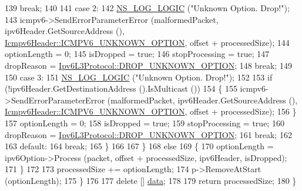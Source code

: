 \begin{DoxyCode}
139               \textcolor{keywordflow}{break};
140 
141             \textcolor{keywordflow}{case} 2:
142               \hyperlink{group__logging_ga88acd260151caf2db9c0fc84997f45ce}{NS\_LOG\_LOGIC} (\textcolor{stringliteral}{"Unknown Option. Drop!"});
143               icmpv6->SendErrorParameterError (malformedPacket, ipv6Header.GetSourceAddress (), 
      \hyperlink{classns3_1_1Icmpv6Header_ae9230cd167393f553a3c2ded106858caa4712d4dbbcd93e660a8ae14f50726629}{Icmpv6Header::ICMPV6\_UNKNOWN\_OPTION}, offset + processedSize);
144               optionLength = 0;
145               isDropped = \textcolor{keyword}{true};
146               stopProcessing = \textcolor{keyword}{true};
147               dropReason = \hyperlink{classns3_1_1Ipv6L3Protocol_a33c64db9bc35f71ff368b132bfffa37aa803fe59e441ce2bc53f0fe19df60c14a}{Ipv6L3Protocol::DROP\_UNKNOWN\_OPTION};
148               \textcolor{keywordflow}{break};
149 
150             \textcolor{keywordflow}{case} 3:
151               \hyperlink{group__logging_ga88acd260151caf2db9c0fc84997f45ce}{NS\_LOG\_LOGIC} (\textcolor{stringliteral}{"Unknown Option. Drop!"});
152 
153               \textcolor{keywordflow}{if} (!ipv6Header.GetDestinationAddress ().IsMulticast ())
154                 \{
155                   icmpv6->SendErrorParameterError (malformedPacket, ipv6Header.GetSourceAddress (), 
      \hyperlink{classns3_1_1Icmpv6Header_ae9230cd167393f553a3c2ded106858caa4712d4dbbcd93e660a8ae14f50726629}{Icmpv6Header::ICMPV6\_UNKNOWN\_OPTION}, offset + processedSize);
156                 \}
157               optionLength = 0;
158               isDropped = \textcolor{keyword}{true};
159               stopProcessing = \textcolor{keyword}{true};
160               dropReason = \hyperlink{classns3_1_1Ipv6L3Protocol_a33c64db9bc35f71ff368b132bfffa37aa803fe59e441ce2bc53f0fe19df60c14a}{Ipv6L3Protocol::DROP\_UNKNOWN\_OPTION};
161               \textcolor{keywordflow}{break};
162 
163             \textcolor{keywordflow}{default}:
164               \textcolor{keywordflow}{break};
165             \}
166 
167         \}
168       \textcolor{keywordflow}{else}
169         \{
170           optionLength = ipv6Option->Process (packet, offset + processedSize, ipv6Header, isDropped);
171         \}
172 
173       processedSize += optionLength;
174       p->RemoveAtStart (optionLength);
175     \}
176 
177   \textcolor{keyword}{delete} [] \hyperlink{topology-example-sim_8cc_a26c65296e316af77b787dc77469bb2a4}{data};
178 
179   \textcolor{keywordflow}{return} processedSize;
180 \}
\end{DoxyCode}


